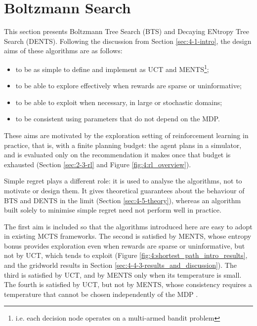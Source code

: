 \section{Boltzmann Search}
\label{sec:4-2-boltzmannsearch}
    
    This section presents Boltzmann Tree Search (BTS) and Decaying ENtropy Tree Search (DENTS). Following the discussion from Section \ref{sec:4-1-intro}, the design aims of these algorithms are as follows:
    \begin{itemize}
        \item to be as simple to define and implement as UCT and MENTS\footnote{i.e. each decision node operates on a multi-armed bandit problem};
        \item to be able to explore effectively when rewards are sparse or uninformative;
        \item to be able to exploit when necessary, in large or stochastic domains;
        \item to be consistent using parameters that do not depend on the MDP.
    \end{itemize}

    These aims are motivated by the exploration setting of reinforcement learning in practice, that is, with a finite planning budget: the agent plans in a simulator, and is evaluated only on the recommendation it makes once that budget is exhausted (Section \mbox{\ref{sec:2-3-rl}} and Figure \mbox{\ref{fig:4:rl_overview}}). 
    
    Simple regret plays a different role: it is used to analyse the algorithms, not to motivate or design them. It gives theoretical guarantees about the behaviour of BTS and DENTS in the limit (Section \mbox{\ref{sec:4-5-theory}}), whereas an algorithm built solely to minimise simple regret need not perform well in practice.

    The first aim is included so that the algorithms introduced here are easy to adopt in existing MCTS frameworks. The second is satisfied by MENTS, whose entropy bonus provides exploration even when rewards are sparse or uninformative, but not by UCT, which tends to exploit (Figure \mbox{\ref{fig:4:shortest_path_intro_results}}, and the gridworld results in Section \mbox{\ref{sec:4-4-3-results_and_discussion}}). The third is satisfied by UCT, and by MENTS only when its temperature is small. The fourth is satisfied by UCT, but not by MENTS, whose consistency requires a temperature that cannot be chosen independently of the MDP \cite{dents}.

